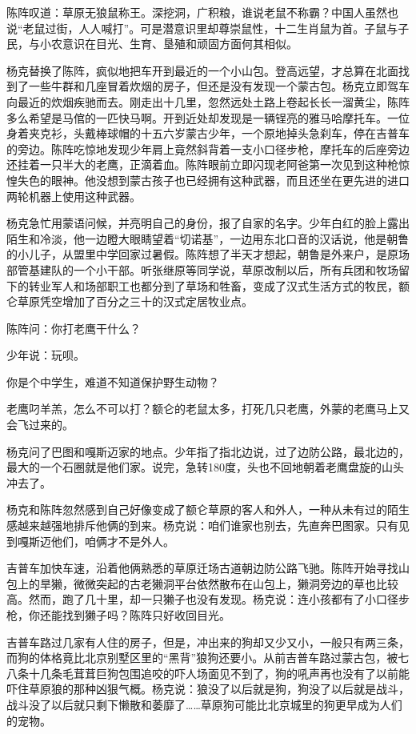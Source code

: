 \par 陈阵叹道：草原无狼鼠称王。深挖洞，广积粮，谁说老鼠不称霸？中国人虽然也说“老鼠过街，人人喊打”。可是潜意识里却尊崇鼠性，十二生肖鼠为首。子鼠与子民，与小农意识在目光、生育、垦殖和顽固方面何其相似。
\par 杨克替换了陈阵，疯似地把车开到最近的一个小山包。登高远望，才总算在北面找到了一些牛群和几座冒着炊烟的房子，但还是没有发现一个蒙古包。杨克立即驾车向最近的炊烟疾驰而去。刚走出十几里，忽然远处土路上卷起长长一溜黄尘，陈阵多么希望是马倌的一匹快马啊。开到近处却发现是一辆锃亮的雅马哈摩托车。一位身着夹克衫，头戴棒球帽的十五六岁蒙古少年，一个原地掉头急刹车，停在吉普车的旁边。陈阵吃惊地发现少年肩上竟然斜背着一支小口径步枪，摩托车的后座旁边还挂着一只半大的老鹰，正滴着血。陈阵眼前立即闪现老阿爸第一次见到这种枪惊惶失色的眼神。他没想到蒙古孩子也已经拥有这种武器，而且还坐在更先进的进口两轮机器上使用这种武器。
\par 杨克急忙用蒙语问候，并亮明自己的身份，报了自家的名字。少年白红的脸上露出陌生和冷淡，他一边瞪大眼睛望着“切诺基”，一边用东北口音的汉话说，他是朝鲁的小儿子，从盟里中学回家过暑假。陈阵想了半天才想起，朝鲁是外来户，是原场部管基建队的一个小干部。听张继原等同学说，草原改制以后，所有兵团和牧场留下的转业军人和场部职工也都分到了草场和牲畜，变成了汉式生活方式的牧民，额仑草原凭空增加了百分之三十的汉式定居牧业点。
\par 陈阵问：你打老鹰干什么？
\par 少年说：玩呗。
\par 你是个中学生，难道不知道保护野生动物？
\par 老鹰叼羊羔，怎么不可以打？额仑的老鼠太多，打死几只老鹰，外蒙的老鹰马上又会飞过来的。
\par 杨克问了巴图和嘎斯迈家的地点。少年指了指北边说，过了边防公路，最北边的，最大的一个石圈就是他们家。说完，急转180度，头也不回地朝着老鹰盘旋的山头冲去了。
\par 杨克和陈阵忽然感到自己好像变成了额仑草原的客人和外人，一种从未有过的陌生感越来越强地排斥他俩的到来。杨克说：咱们谁家也别去，先直奔巴图家。只有见到嘎斯迈他们，咱俩才不是外人。
\par 吉普车加快车速，沿着他俩熟悉的草原迁场古道朝边防公路飞驰。陈阵开始寻找山包上的旱獭，微微突起的古老獭洞平台依然散布在山包上，獭洞旁边的草也比较高。然而，跑了几十里，却一只獭子也没有发现。杨克说：连小孩都有了小口径步枪，你还能找到獭子吗？陈阵只好收回目光。
\par 吉普车路过几家有人住的房子，但是，冲出来的狗却又少又小，一般只有两三条，而狗的体格竟比北京别墅区里的“黑背”狼狗还要小。从前吉普车路过蒙古包，被七八条十几条毛茸茸巨狗包围追咬的吓人场面见不到了，狗的吼声再也没有了以前能吓住草原狼的那种凶狠气概。杨克说：狼没了以后就是狗，狗没了以后就是战斗，战斗没了以后就只剩下懒散和萎靡了……草原狗可能比北京城里的狗更早成为人们的宠物。
